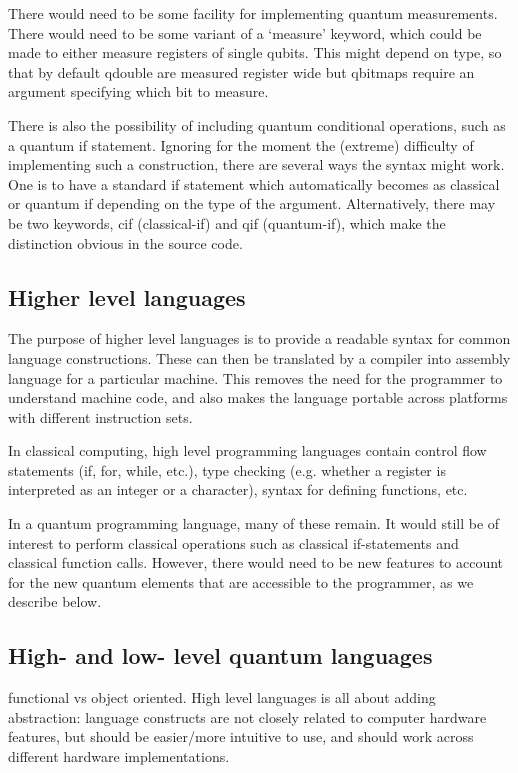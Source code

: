 There would need to be some facility for implementing quantum measurements. There would need to be some variant of a `measure' keyword, which could be made to either measure registers of single qubits. This might depend on type, so that by default qdouble are measured register wide but qbitmaps require an argument specifying which bit to measure.

There is also the possibility of including quantum conditional operations, such as a quantum if statement. Ignoring for the moment the (extreme) difficulty of implementing such a construction, there are several ways the syntax might work. One is to have a standard if statement which automatically becomes as classical or quantum if depending on the type of the argument. Alternatively, there may be two keywords, cif (classical-if) and qif (quantum-if), which make the distinction obvious in the source code.  

\subsection{Higher level languages}

The purpose of higher level languages is to provide a readable syntax for common language constructions. These can then be translated by a compiler into assembly language for a particular machine. This removes the need for the programmer to understand machine code, and also makes the language portable across platforms with different instruction sets. 

In classical computing, high level programming languages contain control flow statements (if, for, while, etc.), type checking (e.g. whether a register is interpreted as an integer or a character), syntax for defining functions, etc. 

In a quantum programming language, many of these remain. It would still be of interest to perform classical operations such as classical if-statements and classical function calls. However, there would need to be new features to account for the new quantum elements that are accessible to the programmer, as we describe below.

\subsection{High- and low- level quantum languages}

functional vs object oriented. High level languages is all about adding abstraction: language constructs are not closely related to computer hardware features, but should be easier/more intuitive to use, and should work across different hardware implementations.


